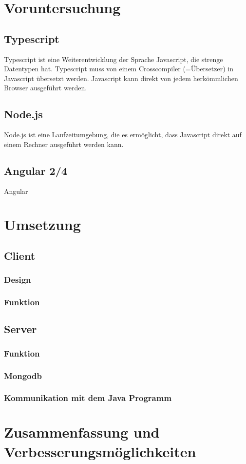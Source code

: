 \section{Voruntersuchung}

\subsection{Typescript}
Typescript ist eine Weiterentwicklung der Sprache Javascript, die strenge Datentypen hat. Typescript muss von einem Crosscompiler (=Übersetzer) in Javascript übersetzt werden. Javascript kann direkt von jedem herkömmlichen Browser ausgeführt werden.

\subsection{Node.js}
Node.js ist eine Laufzeitumgebung, die es ermöglicht, dass Javascript direkt auf einem Rechner ausgeführt werden kann. 

\subsection{Angular 2/4}
Angular  

\section{Umsetzung}

\subsection{Client}

\subsubsection{Design}

\subsubsection{Funktion}

\subsection{Server}

\subsubsection{Funktion}

\subsubsection{Mongodb}

\subsubsection{Kommunikation mit dem Java Programm}

\section{Zusammenfassung und Verbesserungsmöglichkeiten}